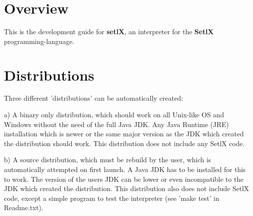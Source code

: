 \def\myDocumentTypeArticle{-}


\globalDate{\today}






\begin{titlepage}
\maketitle
\vfill
\tableofcontents
\end{titlepage}

\section{Overview}

This is the development guide for \textbf{setlX}, an interpreter for the \textbf{SetlX} programming-language.

\section{Distributions}

Three different 'distributions' can be automatically created:

a)  A binary only distribution, which should work on all Unix-like OS and Windows
    without the need of the full Java JDK.
    Any Java Runtime (JRE) installation which is newer or the same major version
    as the JDK which created the distribution should work.
    This distribution does not include any SetlX code.

b)  A source distribution, which must be rebuild by the user, which is automatically
    attempted on first launch. A Java JDK has to be installed for this to work.
    The version of the users JDK can be lower or even incompatible to the JDK
    which created the distribution.
    This distribution also does not include SetlX code, except a simple program
    to test the interpreter (see 'make test' in Readme.txt).

